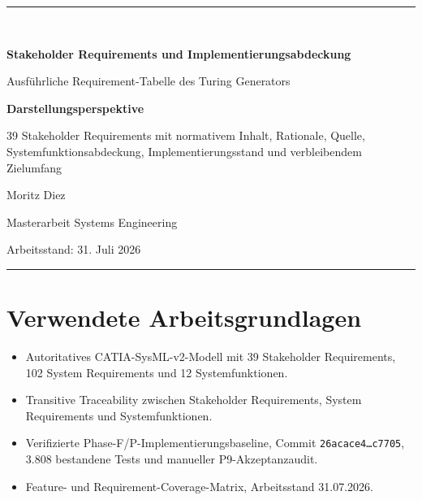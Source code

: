 \documentclass[11pt,a4paper]{scrartcl}
\begin{document}
\begin{titlepage}
  \centering
  \vspace*{2.0cm}
  {\color{TuringBlue}\rule{\textwidth}{1.2pt}}\\[1.2cm]
  {\Huge\bfseries\color{TuringBlue}
  Stakeholder Requirements und Implementierungsabdeckung\par}
  \vspace{0.7cm}
  {\Large Ausführliche Requirement-Tabelle des Turing Generators\par}
  \vspace{1.4cm}

  \begin{tcolorbox}[
    width=0.84\textwidth,
    colback=blue!3,
    colframe=TuringBlue,
    arc=2mm,
    boxrule=0.8pt
  ]
  \centering
  \textbf{Darstellungsperspektive}\par
  39 Stakeholder Requirements mit normativem Inhalt, Rationale, Quelle,\\
  Systemfunktionsabdeckung, Implementierungsstand und verbleibendem Zielumfang
  \end{tcolorbox}

  \vfill
  {\large Moritz Diez\par}
  \vspace{3mm}
  {\normalsize Masterarbeit Systems Engineering\par}
  \vspace{8mm}
  {\normalsize Arbeitsstand: 31. Juli 2026\par}
  \vspace{1.3cm}
  {\color{TuringBlue}\rule{\textwidth}{1.2pt}}
\end{titlepage}

\tableofcontents
\clearpage



\clearpage
\section*{Verwendete Arbeitsgrundlagen}
\begin{itemize}[leftmargin=7mm,itemsep=2mm]
  \item Autoritatives CATIA-SysML-v2-Modell mit 39 Stakeholder Requirements,
  102 System Requirements und 12 Systemfunktionen.
  \item Transitive Traceability zwischen Stakeholder Requirements,
  System Requirements und Systemfunktionen.
  \item Verifizierte Phase-F/P-Implementierungsbaseline,
  Commit \texttt{26acace4\ldots c7705}, 3.808 bestandene Tests und
  manueller P9-Akzeptanzaudit.
  \item Feature- und Requirement-Coverage-Matrix,
  Arbeitsstand 31.07.2026.
\end{itemize}
\end{document}
